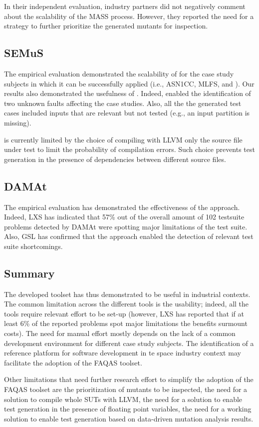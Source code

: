 In their independent evaluation, industry partners did not negatively comment about the scalability of the MASS process. However, they reported the need for a strategy to further prioritize the generated mutants for inspection.

\subsection*{SEMuS}

The empirical evaluation demonstrated the scalability of \SEMUS for the case study subjects in which it can be successfully applied (i.e., ASN1CC, MLFS, and \UTIL). 
Our results also demonstrated the usefulness of \SEMUS. Indeed, \SEMUS enabled the identification of two unknown faults affecting the case studies. Also, all the the generated test cases included inputs that are relevant but not tested (e.g., an input partition is missing).

\SEMUS is currently limited by the choice of compiling with LLVM only the source file under test to limit the probability of compilation errors. Such choice prevents test generation in the presence of dependencies between different source files.


\subsection*{DAMAt}

The empirical evaluation has demonstrated the effectiveness of the approach. Indeed, LXS has indicated that 57\% out of the overall amount of 102 testsuite problems detected by DAMAt were spotting major limitations of the test suite. Also, GSL has confirmed that the approach enabled the detection of relevant test suite shortcomings.


\subsection*{Summary}

The developed toolset has thus demonstrated to be useful in industrial contexts. The common limitation across the different tools is the usability; indeed, all the tools require relevant effort to be set-up (however, LXS has reported that if at least 6\% of the reported problems spot major limitations the benefits surmount costs). The need for manual effort mostly depends on the lack of a common development environment for different case study subjects. The identification of a reference platform for software development in te space industry context may facilitate the adoption of the FAQAS toolset.

Other limitations that need further research effort to simplify the adoption of the FAQAS toolset are the prioritization of mutants to be inspected, the need for a solution to compile whole SUTs with LLVM, the need for a solution to enable test generation in the presence of floating point variables, the need for a working solution to enable test generation based on data-driven mutation analysis results. 